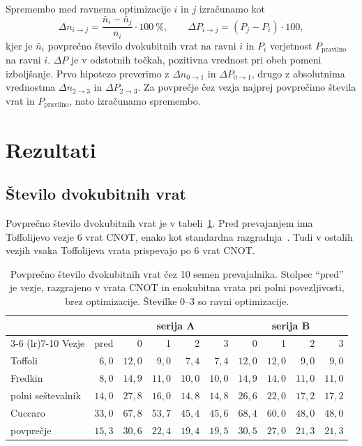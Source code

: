 \documentclass[graybox, envcountchap]{svmult}
\begin{document}
Spremembo med ravnema optimizacije $i$ in $j$ izračunamo kot
\begin{equation}
\Delta n_{i \to j} = \frac{\bar{n}_i - \bar{n}_j}{\bar{n}_i} \cdot 100~\% ,
\qquad
\Delta P_{i \to j} = \left( P_j - P_i \right) \cdot 100 ,
\label{g10:eq:spremembe}
\end{equation}
kjer je $\bar{n}_i$ povprečno število dvokubitnih vrat na ravni $i$
in $P_i$ verjetnost $P_\text{pravilno}$ na ravni $i$.
$\Delta P$ je v odstotnih točkah,
pozitivna vrednost pri obeh pomeni izboljšanje.
Prvo hipotezo preverimo z $\Delta n_{0\to1}$ in $\Delta P_{0\to1}$,
drugo z absolutnima vrednostma $\Delta n_{2\to3}$ in $\Delta P_{2\to3}$.
Za povprečje čez vezja najprej povprečimo števila vrat
in $P_\text{pravilno}$, nato izračunamo spremembo.


\section{Rezultati}
\label{g10:sec:rezultati}

\subsection{Število dvokubitnih vrat}
\label{g10:sec:rez_vrata}

Povprečno število dvokubitnih vrat je v tabeli~\ref{g10:tab:vrata}.
Pred prevajanjem ima Toffolijevo vezje 6 vrat CNOT,
enako kot standardna razgradnja~\cite{nielsen2010}.
Tudi v ostalih vezjih vsaka Toffolijeva vrata
prispevajo po 6 vrat CNOT.

\begin{table}[htbp]
\caption{Povprečno število dvokubitnih vrat čez 10 semen prevajalnika.
Stolpec \enquote{pred} je vezje, razgrajeno v vrata CNOT
in enokubitna vrata pri polni povezljivosti, brez optimizacije.
Številke 0--3 so ravni optimizacije.}
\label{g10:tab:vrata}
\centering
\small
\setlength{\tabcolsep}{4pt}
\begin{tabular}{lrrrrrrrrr}
\toprule
 & & \multicolumn{4}{c}{serija A} & \multicolumn{4}{c}{serija B} \\
\cmidrule(lr){3-6} \cmidrule(lr){7-10}
Vezje & pred & 0 & 1 & 2 & 3 & 0 & 1 & 2 & 3 \\
\midrule
Toffoli & $6{,}0$ & $12{,}0$ & $9{,}0$ & $7{,}4$ & $7{,}4$ & $12{,}0$ & $12{,}0$ & $9{,}0$ & $9{,}0$ \\
Fredkin & $8{,}0$ & $14{,}9$ & $11{,}0$ & $10{,}0$ & $10{,}0$ & $14{,}9$ & $14{,}0$ & $11{,}0$ & $11{,}0$ \\
polni seštevalnik & $14{,}0$ & $27{,}8$ & $16{,}0$ & $14{,}8$ & $14{,}8$ & $26{,}6$ & $22{,}0$ & $17{,}2$ & $17{,}2$ \\
Cuccaro & $33{,}0$ & $67{,}8$ & $53{,}7$ & $45{,}4$ & $45{,}6$ & $68{,}4$ & $60{,}0$ & $48{,}0$ & $48{,}0$ \\
\midrule
povprečje & $15{,}3$ & $30{,}6$ & $22{,}4$ & $19{,}4$ & $19{,}5$ & $30{,}5$ & $27{,}0$ & $21{,}3$ & $21{,}3$ \\
\bottomrule
\end{tabular}
\end{table}
\end{document}
